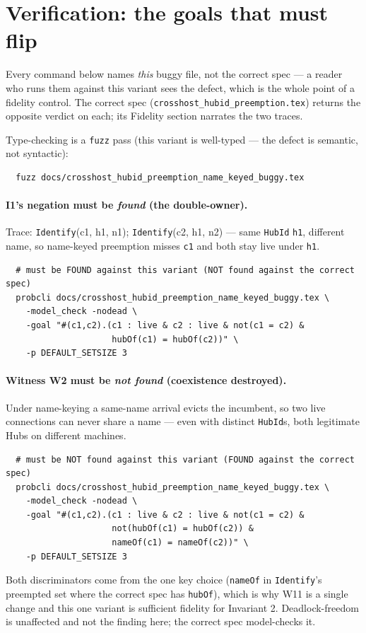 \documentclass[a4paper,10pt,fleqn]{article}
\begin{document}
\section{Verification: the goals that must flip}
\label{sec:verify}

Every command below names \emph{this} buggy file, not the correct spec ---
a reader who runs them against this variant sees the defect, which is the
whole point of a fidelity control.  The correct spec
(\texttt{crosshost\_hubid\_preemption.tex}) returns the opposite verdict on
each; its Fidelity section narrates the two traces.

Type-checking is a \texttt{fuzz} pass (this variant is well-typed --- the
defect is semantic, not syntactic):
\begin{verbatim}
  fuzz docs/crosshost_hubid_preemption_name_keyed_buggy.tex
\end{verbatim}

\paragraph{I1's negation must be \emph{found} (the double-owner).} Trace:
\texttt{Identify}(c1, h1, n1); \texttt{Identify}(c2, h1, n2) --- same
\texttt{HubId} \texttt{h1}, different name, so name-keyed preemption misses
\texttt{c1} and both stay live under \texttt{h1}.
\begin{verbatim}
  # must be FOUND against this variant (NOT found against the correct spec)
  probcli docs/crosshost_hubid_preemption_name_keyed_buggy.tex \
    -model_check -nodead \
    -goal "#(c1,c2).(c1 : live & c2 : live & not(c1 = c2) &
                     hubOf(c1) = hubOf(c2))" \
    -p DEFAULT_SETSIZE 3
\end{verbatim}

\paragraph{Witness W2 must be \emph{not found} (coexistence destroyed).}
Under name-keying a same-name arrival evicts the incumbent, so two live
connections can never share a name --- even with distinct \texttt{HubId}s,
both legitimate Hubs on different machines.
\begin{verbatim}
  # must be NOT found against this variant (FOUND against the correct spec)
  probcli docs/crosshost_hubid_preemption_name_keyed_buggy.tex \
    -model_check -nodead \
    -goal "#(c1,c2).(c1 : live & c2 : live & not(c1 = c2) &
                     not(hubOf(c1) = hubOf(c2)) &
                     nameOf(c1) = nameOf(c2))" \
    -p DEFAULT_SETSIZE 3
\end{verbatim}

Both discriminators come from the one key choice (\texttt{nameOf} in
\texttt{Identify}'s preempted set where the correct spec has
\texttt{hubOf}), which is why W11 is a single change and this one variant is
sufficient fidelity for Invariant 2. Deadlock-freedom is unaffected and
not the finding here; the correct spec model-checks it.
\end{document}
